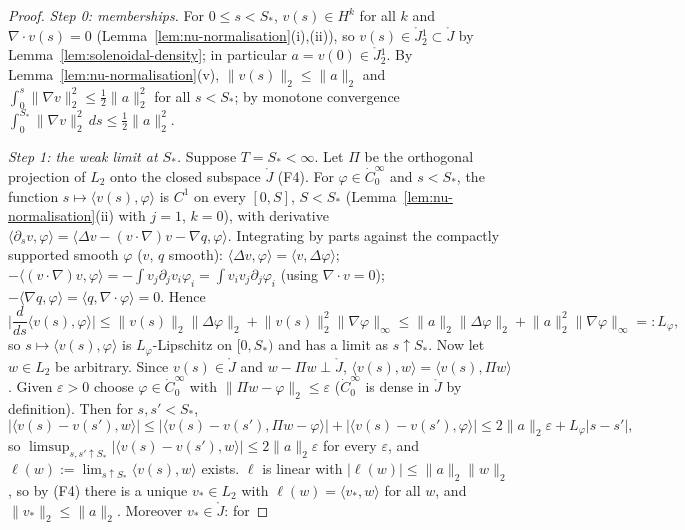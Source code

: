 \documentclass[11pt]{article}
\theoremstyle{definition}
\theoremstyle{plain}
\newcommand{\norm}[1]{\lVert #1\rVert}
\begin{document}
\begin{proof}
\emph{Step 0: memberships.}  For $0\leq s<S_*$, $v(s)\in H^k$ for all $k$ and
$\nabla\cdot v(s)=0$ (Lemma~\ref{lem:nu-normalisation}(i),(ii)), so
$v(s)\in\mathring J{}^1_2\subset\mathring J$ by
Lemma~\ref{lem:solenoidal-density}; in particular $a=v(0)\in\mathring J{}^1_2$.
By Lemma~\ref{lem:nu-normalisation}(v), $\norm{v(s)}_2\leq\norm a_2$ and
$\int_0^s\norm{\nabla v}_2^2\leq\tfrac12\norm a_2^2$ for all $s<S_*$; by
monotone convergence $\int_0^{S_*}\norm{\nabla v}_2^2\,ds\leq\tfrac12\norm a_2^2$.

\emph{Step 1: the weak limit at $S_*$.}  Suppose $T=S_*<\infty$.  Let $\Pi$ be
the orthogonal projection of $L_2$ onto the closed subspace $\mathring J$
(F4).  For $\varphi\in\dot C_0^\infty$ and $s<S_*$, the function
$s\mapsto\langle v(s),\varphi\rangle$ is $C^1$ on every $[0,S]$, $S<S_*$
(Lemma~\ref{lem:nu-normalisation}(ii) with $j=1$, $k=0$), with derivative
$\langle\partial_sv,\varphi\rangle=\langle\Delta v-(v\cdot\nabla)v-\nabla q,\varphi\rangle$.
Integrating by parts against the compactly supported smooth $\varphi$
($v$, $q$ smooth):
$\langle\Delta v,\varphi\rangle=\langle v,\Delta\varphi\rangle$;
$-\langle(v\cdot\nabla)v,\varphi\rangle=-\int v_j\partial_jv_i\varphi_i
=\int v_iv_j\partial_j\varphi_i$ (using $\nabla\cdot v=0$);
$-\langle\nabla q,\varphi\rangle=\langle q,\nabla\cdot\varphi\rangle=0$.  Hence
\[
 \Big|\frac{d}{ds}\langle v(s),\varphi\rangle\Big|
 \leq\norm{v(s)}_2\norm{\Delta\varphi}_2+\norm{v(s)}_2^2\norm{\nabla\varphi}_\infty
 \leq\norm a_2\norm{\Delta\varphi}_2+\norm a_2^2\norm{\nabla\varphi}_\infty=:L_\varphi ,
\]
so $s\mapsto\langle v(s),\varphi\rangle$ is $L_\varphi$-Lipschitz on $[0,S_*)$
and has a limit as $s\uparrow S_*$.  Now let $w\in L_2$ be arbitrary.  Since
$v(s)\in\mathring J$ and $w-\Pi w\perp\mathring J$,
$\langle v(s),w\rangle=\langle v(s),\Pi w\rangle$.  Given $\varepsilon>0$ choose
$\varphi\in\dot C_0^\infty$ with $\norm{\Pi w-\varphi}_2\leq\varepsilon$
($\dot C_0^\infty$ is dense in $\mathring J$ by definition).  Then for
$s,s'<S_*$,
\[
 |\langle v(s)-v(s'),w\rangle|
 \leq|\langle v(s)-v(s'),\Pi w-\varphi\rangle|+|\langle v(s)-v(s'),\varphi\rangle|
 \leq2\norm a_2\varepsilon+L_\varphi|s-s'| ,
\]
so $\limsup_{s,s'\uparrow S_*}|\langle v(s)-v(s'),w\rangle|\leq2\norm a_2\varepsilon$
for every $\varepsilon$, and $\ell(w):=\lim_{s\uparrow S_*}\langle v(s),w\rangle$
exists.  $\ell$ is linear with $|\ell(w)|\leq\norm a_2\norm w_2$, so by (F4)
there is a unique $v_*\in L_2$ with $\ell(w)=\langle v_*,w\rangle$ for all $w$,
and $\norm{v_*}_2\leq\norm a_2$.  Moreover $v_*\in\mathring J$: for

\end{proof}
\end{document}
